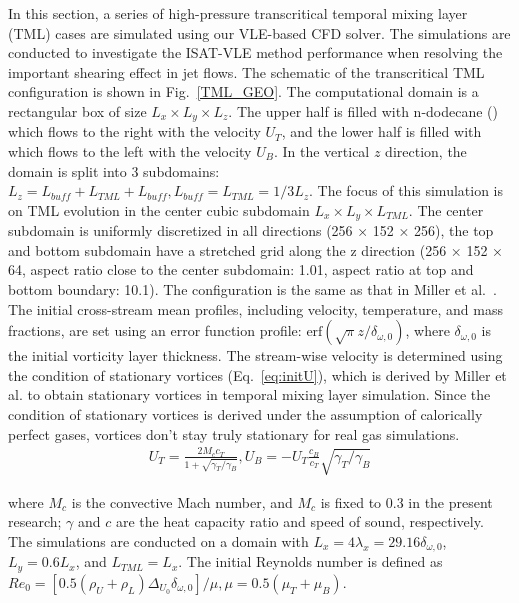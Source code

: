 In this section, a series of high-pressure transcritical temporal mixing layer (TML) cases are simulated using our VLE-based CFD solver. The simulations are conducted to investigate the ISAT-VLE method performance when resolving the important shearing effect in jet flows. The schematic of the transcritical TML configuration is shown in Fig.~\ref{TML_GEO}. The computational domain is a rectangular box of size $L_x \times L_y \times L_z$.
The upper half is filled with n-dodecane () which flows to the right with the velocity $U_T$, and the lower half is filled with  which flows to the left with the velocity $U_B$. In the vertical $z$ direction, the domain is split into 3 subdomains: $L_z = L_{buff}+L_{TML}+L_{buff}, L_{buff} = L_{TML} = 1/3 L_z$. The focus of this simulation is on TML evolution in the center cubic subdomain $L_x \times L_y \times L_{TML}$. The center subdomain is uniformly discretized in all directions (256 × 152 × 256), the top and bottom subdomain have a stretched grid along the z direction (256 × 152 × 64, aspect ratio close to the center subdomain: 1.01, aspect ratio at top and bottom boundary: 10.1). The configuration is the same as that in Miller et al.~\cite{miller2001direct}. The initial cross-stream mean profiles, including velocity, temperature, and mass fractions, are set using an error function profile: $\textrm{erf}(\sqrt{\pi}z/\delta_{\omega,0})$, where $\delta_{\omega,0}$ is the initial vorticity layer thickness. The stream-wise velocity is determined using the condition of stationary vortices (Eq.~\ref{eq:initU}), which is derived by Miller et al. \cite{miller2001direct} to obtain stationary vortices in temporal mixing layer simulation. Since the condition of stationary vortices is derived under the assumption of calorically perfect gases, vortices don't stay truly stationary for real gas simulations.
\begin{align} U_T = \frac{2M_c c_T}{1+\sqrt{\gamma_T/\gamma_B}},U_B = -U_T \frac{c_B}{c_T}\sqrt{\gamma_T/\gamma_B} \label{eq:initU} \end{align}

where $M_c$ is the convective Mach number, and $M_c$ is fixed to 0.3 in the present research; $\gamma$ and $c$ are the heat capacity ratio and speed of sound, respectively. 
The simulations are conducted on a domain with $L_x = 4 \lambda_x = 29.16 \delta_{\omega,0}$, $L_y = 0.6 L_x$, and $L_{TML}=L_x$. 
The initial Reynolds number is defined as $Re_0 = [0.5(\rho_U +\rho_L)\Delta_{U_0} \delta_{\omega,0}]/\mu,\mu = 0.5 (\mu_T+\mu_B)$.

